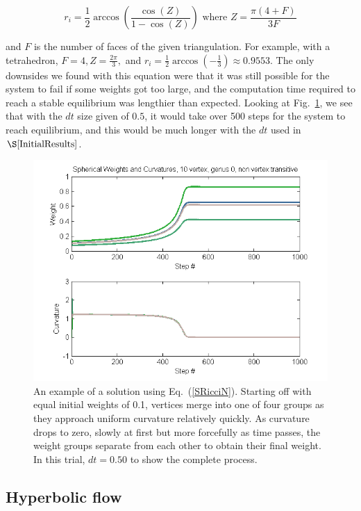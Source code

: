 \documentclass[12pt]{article}
\begin{document}
$$r_i = \frac{1}{2}\arccos(\frac{\cos(Z)}{1 - \cos(Z)}) \mbox{ where } Z = \frac{\pi(4 + F)}{3F}$$

\noindent and $F$ is the number of faces of the given triangulation. For example, with a tetrahedron, $F = 4, Z = \frac{2\pi}{3},$ and $r_i = \frac{1}{2}\arccos(-\frac{1}{3}) \approx 0.9553.$ The only downsides we found with this equation were that it was still possible for the system to fail if some weights got too large, and the computation time required to reach a stable equilibrium was lengthier than expected. Looking at Fig.~\ref{SphGood}, we see that with the $dt$ size given of $0.5$, it would take over 500 steps for the system to reach equilibrium, and this would be much longer with the $dt$ used in $\S\ref{InitialResults}$.  

\begin{figure}[ht]
\centering
\includegraphics[scale = 0.8]{Pictures/SphG0V10.png}
\caption{An example of a solution using Eq.~(\ref{SRicciN}). Starting off with equal initial weights of 0.1, vertices merge into one of four groups as they approach uniform curvature relatively quickly. As curvature drops to zero, slowly at first but more forcefully as time passes, the weight groups separate from each other to obtain their final weight. In this trial, $dt = 0.50$ to show the complete process.}
\label{SphGood}  
\end{figure}

\subsection{Hyperbolic flow}
\end{document}
